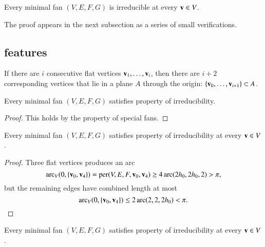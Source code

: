 \begin{lemma}\label{lemma:min-irred}
Every minimal fan $(V,E,F,G)$ is irreducible at every ${\mathbf v}\in V$.
\end{lemma}

The proof appears in the next subsection as a series of small verifications.

\subsection{features}

 If there are $i$ consecutive flat vertices ${\mathbf v}_1,\ldots,{\mathbf v}_i$, then there are  $i+2$ corresponding vertices that lie in a plane $A$ through the origin: $\{{\mathbf v}_0,\ldots,{\mathbf v}_{i+1}\}\subset A$.

\begin{lemma}
Every minimal fan $(V,E,F,G)$ satisfies property  of irreducibility.
\end{lemma}

\begin{proof} This holds by the property  of special fans.
\end{proof}


\begin{lemma}
Every minimal fan $(V,E,F,G)$ satisfies property  of irreducibility at every ${\mathbf v}\in V$.  
\end{lemma}

\begin{proof}  Three flat vertices produces an arc
$$
\operatorname{arc}_V(0,\{{\mathbf v}_0,{\mathbf v}_4\}) = {\operatorname{per}}(V,E,F,{\mathbf v}_0,{\mathbf v}_4) \ge4\operatorname{arc}(2{h_0},2{h_0},2) > \pi,
$$
but the remaining edges  have combined length at most
$$
\operatorname{arc}_V(0,\{{\mathbf v}_0,{\mathbf v}_4\})\le 2\operatorname{arc}(2,2,2{h_0}) < \pi.
$$
\end{proof}


\begin{lemma}
Every minimal fan $(V,E,F,G)$ satisfies property  of irreducibility at every ${\mathbf v}\in V$.
\end{lemma}

